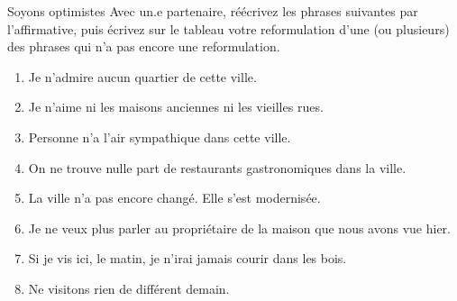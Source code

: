 \begin{frame}{Soyons optimistes}
  Avec un.e partenaire, réécrivez les phrases suivantes par l'affirmative, puis \alert{écrivez sur le tableau} votre reformulation d'une (ou plusieurs) des phrases qui n'a pas encore une reformulation.
  \begin{enumerate}
    \item Je n'admire aucun quartier de cette ville.
    \item Je n'aime ni les maisons anciennes ni les vieilles rues.
    \item Personne n'a l'air sympathique dans cette ville.
    \item On ne trouve nulle part de restaurants gastronomiques dans la ville.
    \item La ville n'a pas encore changé. Elle s'est modernisée.
    \item Je ne veux plus parler au propriétaire de la maison que nous avons vue hier.
    \item Si je vis ici, le matin, je n'irai jamais courir dans les bois.
    \item Ne visitons rien de différent demain.
  \end{enumerate}
\end{frame}